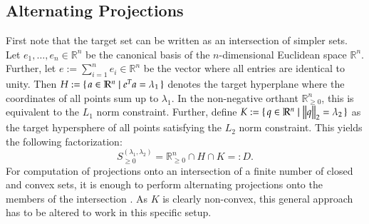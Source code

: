 \documentclass[twoside,11pt]{article}
\newcommand{\R}{\mathbb{R}}
\newcommand{\0}{\mathcal{O}}
\newcommand{\transp}{^T}
\newcommand{\norm}[1]{\left\Vert#1\right\Vert}
\begin{document}
\subsection{Alternating Projections}
\label{sect:alternating_projections}
First note that the target set can be written as an intersection of simpler sets.
Let $e_1,\dotsc,e_n\in\R^n$ be the canonical basis of the $n$-dimensional Euclidean space $\R^n$.
Further, let $e := \sum_{i=1}^ne_i\in\R^n$ be the vector where all entries are identical to unity.
Then $H := \set{a\in\R^n | e\transp a = \lambda_1}$ denotes the target hyperplane where the coordinates of all points sum up to $\lambda_1$.
In the non-negative orthant $\R_{\geq 0}^n$, this is equivalent to the $L_1$ norm constraint.
Further, define $K := \set{q\in\R^n | \norm{q}_2 = \lambda_2}$ as the target hypersphere of all points satisfying the $L_2$ norm constraint.
This yields the following factorization:
\begin{displaymath}
  S_{\geq 0}^{(\lambda_1,\lambda_2)} = \R_{\geq 0}^n \cap H \cap K =: D\text{.}
\end{displaymath}
For computation of projections onto an intersection of a finite number of closed and convex sets, it is enough to perform alternating projections onto the members of the intersection \citep{Deutsch2001}.
As $K$ is clearly non-convex, this general approach has to be altered to work in this specific setup.
\end{document}
